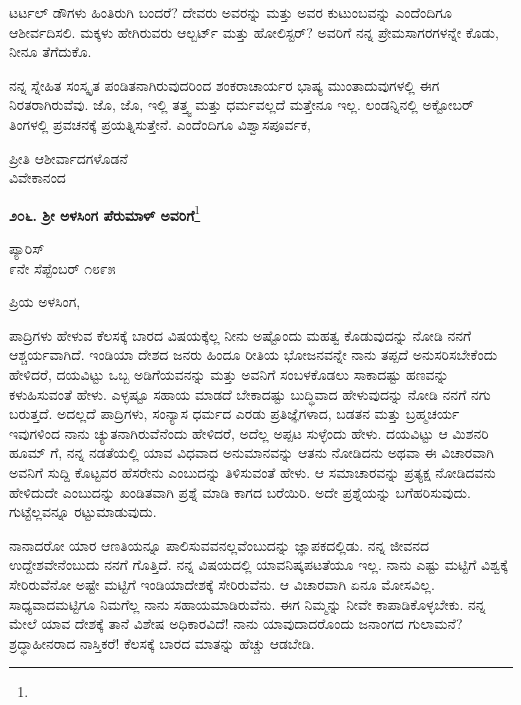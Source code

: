 ಟರ್ಟಲ್ ಡೌಗಳು ಹಿಂತಿರುಗಿ ಬಂದರೆ? ದೇವರು ಅವರನ್ನು ಮತ್ತು ಅವರ ಕುಟುಂಬವನ್ನು ಎಂದೆಂದಿಗೂ ಆಶೀರ್ವದಿಸಲಿ. ಮಕ್ಕಳು ಹೇಗಿರುವರು\enginline{-} ಆಲ್ಬರ್ಟ್ ಮತ್ತು ಹೋಲಿಸ್ಟರ್? ಅವರಿಗೆ ನನ್ನ ಪ್ರೇಮಸಾಗರಗಳನ್ನೇ ಕೊಡು, ನೀನೂ ತೆಗೆದುಕೊ.
\vspace{0.1cm}

ನನ್ನ ಸ್ನೇಹಿತ ಸಂಸ್ಕೃತ ಪಂಡಿತನಾಗಿರುವುದರಿಂದ ಶಂಕರಾಚಾರ್ಯರ ಭಾಷ್ಯ ಮುಂತಾದುವುಗಳಲ್ಲಿ ಈಗ ನಿರತರಾಗಿರುವೆವು. ಜೊ, ಜೊ, ಇಲ್ಲಿ ತತ್ತ್ವ ಮತ್ತು ಧರ್ಮವಲ್ಲದೆ ಮತ್ತೇನೂ ಇಲ್ಲ. ಲಂಡನ್ನಿನಲ್ಲಿ ಅಕ್ಟೋಬರ್ ತಿಂಗಳಲ್ಲಿ ಪ್ರವಚನಕ್ಕೆ ಪ್ರಯತ್ನಿಸುತ್ತೇನೆ. ಎಂದೆಂದಿಗೂ ವಿಶ್ವಾಸಪೂರ್ವಕ,

{\flushright
ಪ್ರೀತಿ ಆಶೀರ್ವಾದಗಳೊಡನೆ\\ವಿವೇಕಾನಂದ\par}

\begin{center}
\textbf{೨೦೬. ಶ‍್ರೀ ಅಳಸಿಂಗ ಪೆರುಮಾಳ್ ಅವರಿಗೆ}\footnote{}
\end{center}

\begin{flushright}
ಪ್ಯಾರಿಸ್\\೯ನೇ ಸೆಪ್ಟೆಂಬರ್ ೧೮೯೫
\end{flushright}

\noindent
ಪ್ರಿಯ ಅಳಸಿಂಗ,

ಪಾದ್ರಿಗಳು ಹೇಳುವ ಕೆಲಸಕ್ಕೆ ಬಾರದ ವಿಷಯಕ್ಕೆಲ್ಲ ನೀನು ಅಷ್ಟೊಂದು ಮಹತ್ವ ಕೊಡುವುದನ್ನು ನೋಡಿ ನನಗೆ ಆಶ್ಚರ್ಯವಾಗಿದೆ. ಇಂಡಿಯಾ ದೇಶದ ಜನರು ಹಿಂದೂ ರೀತಿಯ ಭೋಜನವನ್ನೇ ನಾನು ತಪ್ಪದೆ ಅನುಸರಿಸಬೇಕೆಂದು ಹೇಳಿದರೆ, ದಯವಿಟ್ಟು ಒಬ್ಬ ಅಡಿಗೆಯವನನ್ನು ಮತ್ತು ಅವನಿಗೆ ಸಂಬಳಕೊಡಲು ಸಾಕಾದಷ್ಟು ಹಣವನ್ನು ಕಳುಹಿಸುವಂತೆ ಹೇಳು. ಎಳ್ಳಷ್ಟೂ ಸಹಾಯ ಮಾಡದೆ ಬೇಕಾದಷ್ಟು ಬುದ್ಧಿವಾದ ಹೇಳುವುದನ್ನು ನೋಡಿ ನನಗೆ ನಗು ಬರುತ್ತದೆ. ಅದಲ್ಲದೆ ಪಾದ್ರಿಗಳು, ಸಂನ್ಯಾಸ ಧರ್ಮದ ಎರಡು ಪ್ರತಿಜ್ಞೆಗಳಾದ, ಬಡತನ ಮತ್ತು ಬ್ರಹ್ಮಚರ್ಯ ಇವುಗಳಿಂದ ನಾನು ಚ್ಯುತನಾಗಿರುವೆನೆಂದು ಹೇಳಿದರೆ, ಅದೆಲ್ಲ ಅಪ್ಪಟ ಸುಳ್ಳೆಂದು ಹೇಳು. ದಯವಿಟ್ಟು ಆ ಮಿಶನರಿ ಹೂಮ್ ಗೆ, ನನ್ನ ನಡತೆಯಲ್ಲಿ ಯಾವ ವಿಧವಾದ ಅನುಮಾನವನ್ನು ಆತನು ನೋಡಿದನು ಅಥವಾ ಈ ವಿಚಾರವಾಗಿ ಅವನಿಗೆ ಸುದ್ದಿ ಕೊಟ್ಟವರ ಹೆಸರೇನು ಎಂಬುದನ್ನು ತಿಳಿಸುವಂತೆ ಹೇಳು. ಆ ಸಮಾಚಾರವನ್ನು ಪ್ರತ್ಯಕ್ಷ ನೋಡಿದವನು ಹೇಳಿದುದೇ ಎಂಬುದನ್ನು ಖಂಡಿತವಾಗಿ ಪ್ರಶ್ನೆ ಮಾಡಿ ಕಾಗದ ಬರೆಯಿರಿ. ಅದೇ ಪ್ರಶ್ನೆಯನ್ನು ಬಗೆಹರಿಸುವುದು. ಗುಟ್ಟೆಲ್ಲವನ್ನೂ ರಟ್ಟುಮಾಡುವುದು.

ನಾನಾದರೋ ಯಾರ ಆಣತಿಯನ್ನೂ ಪಾಲಿಸುವವನಲ್ಲವೆಂಬುದನ್ನು ಜ್ಞಾಪಕದಲ್ಲಿಡು. ನನ್ನ ಜೀವನದ ಉದ್ದೇಶವೇನೆಂಬುದು ನನಗೆ ಗೊತ್ತಿದೆ. ನನ್ನ ವಿಷಯದಲ್ಲಿ ಯಾವ\break ನಿಷ್ಕಪಟತೆಯೂ ಇಲ್ಲ. ನಾನು ಎಷ್ಟು ಮಟ್ಟಿಗೆ ವಿಶ್ವಕ್ಕೆ ಸೇರಿರುವೆನೋ ಅಷ್ಟೇ ಮಟ್ಟಿಗೆ ಇಂಡಿಯಾದೇಶಕ್ಕೆ ಸೇರಿರುವೆನು. ಆ ವಿಚಾರವಾಗಿ ಏನೂ ಮೋಸವಿಲ್ಲ. ಸಾಧ್ಯವಾದಮಟ್ಟಿಗೂ ನಿಮಗೆಲ್ಲ ನಾನು ಸಹಾಯಮಾಡಿರುವೆನು. ಈಗ ನಿಮ್ಮನ್ನು ನೀವೇ ಕಾಪಾಡಿಕೊಳ್ಳಬೇಕು. ನನ್ನ ಮೇಲೆ ಯಾವ ದೇಶಕ್ಕೆ ತಾನೆ ವಿಶೇಷ ಅಧಿಕಾರವಿದೆ! ನಾನು ಯಾವುದಾದರೊಂದು ಜನಾಂಗದ ಗುಲಾಮನೆ? ಶ್ರದ್ಧಾಹೀನರಾದ ನಾಸ್ತಿಕರೆ! ಕೆಲಸಕ್ಕೆ ಬಾರದ ಮಾತನ್ನು ಹೆಚ್ಚು ಆಡಬೇಡಿ.

\vspace{0.15cm}

